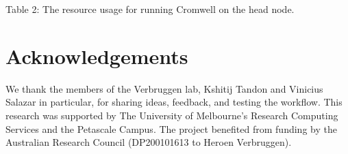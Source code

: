 Table 2: The resource usage for running Cromwell on the head node.

\hypertarget{acknowledgements}{%
\section{Acknowledgements}\label{acknowledgements}}

We thank the members of the Verbruggen lab, Kshitij Tandon and Vinicius
Salazar in particular, for sharing ideas, feedback, and testing the
workflow. This research was supported by The University of Melbourne's
Research Computing Services and the Petascale Campus. The project
benefited from funding by the Australian Research Council (DP200101613
to Heroen Verbruggen).
